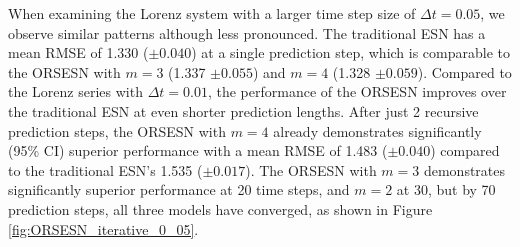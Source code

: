 When examining the Lorenz system with a larger time step size of $\Delta t=0.05$, we observe similar patterns although less pronounced. The traditional ESN has a mean RMSE of 1.330 ($\pm 0.040$) at a single prediction step, which is comparable to the ORSESN with $m=3$ (1.337 $\pm 0.055$) and $m=4$ (1.328 $\pm 0.059$). Compared to the Lorenz series with $\Delta t=0.01$, the performance of the ORSESN improves over the traditional ESN at even shorter prediction lengths. After just 2 recursive prediction steps, the ORSESN with $m=4$ already demonstrates significantly (95\% CI) superior performance with a mean RMSE of 1.483 ($\pm 0.040$) compared to the traditional ESN's 1.535 ($\pm 0.017$). The ORSESN with $m=3$ demonstrates significantly superior performance at 20 time steps, and $m=2$ at 30, but by 70 prediction steps, all three models have converged, as shown in Figure \ref{fig:ORSESN_iterative_0_05}.


